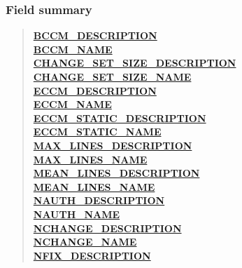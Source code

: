 {{\subsubsection{Field summary}{
\begin{verse}
\hyperlink{it.unisa.sesa.repominer.db.entities.Metric.BCCM_DESCRIPTION}{{\bf BCCM\_DESCRIPTION}} \\
\hyperlink{it.unisa.sesa.repominer.db.entities.Metric.BCCM_NAME}{{\bf BCCM\_NAME}} \\
\hyperlink{it.unisa.sesa.repominer.db.entities.Metric.CHANGE_SET_SIZE_DESCRIPTION}{{\bf CHANGE\_SET\_SIZE\_DESCRIPTION}} \\
\hyperlink{it.unisa.sesa.repominer.db.entities.Metric.CHANGE_SET_SIZE_NAME}{{\bf CHANGE\_SET\_SIZE\_NAME}} \\
\hyperlink{it.unisa.sesa.repominer.db.entities.Metric.ECCM_DESCRIPTION}{{\bf ECCM\_DESCRIPTION}} \\
\hyperlink{it.unisa.sesa.repominer.db.entities.Metric.ECCM_NAME}{{\bf ECCM\_NAME}} \\
\hyperlink{it.unisa.sesa.repominer.db.entities.Metric.ECCM_STATIC_DESCRIPTION}{{\bf ECCM\_STATIC\_DESCRIPTION}} \\
\hyperlink{it.unisa.sesa.repominer.db.entities.Metric.ECCM_STATIC_NAME}{{\bf ECCM\_STATIC\_NAME}} \\
\hyperlink{it.unisa.sesa.repominer.db.entities.Metric.MAX_LINES_DESCRIPTION}{{\bf MAX\_LINES\_DESCRIPTION}} \\
\hyperlink{it.unisa.sesa.repominer.db.entities.Metric.MAX_LINES_NAME}{{\bf MAX\_LINES\_NAME}} \\
\hyperlink{it.unisa.sesa.repominer.db.entities.Metric.MEAN_LINES_DESCRIPTION}{{\bf MEAN\_LINES\_DESCRIPTION}} \\
\hyperlink{it.unisa.sesa.repominer.db.entities.Metric.MEAN_LINES_NAME}{{\bf MEAN\_LINES\_NAME}} \\
\hyperlink{it.unisa.sesa.repominer.db.entities.Metric.NAUTH_DESCRIPTION}{{\bf NAUTH\_DESCRIPTION}} \\
\hyperlink{it.unisa.sesa.repominer.db.entities.Metric.NAUTH_NAME}{{\bf NAUTH\_NAME}} \\
\hyperlink{it.unisa.sesa.repominer.db.entities.Metric.NCHANGE_DESCRIPTION}{{\bf NCHANGE\_DESCRIPTION}} \\
\hyperlink{it.unisa.sesa.repominer.db.entities.Metric.NCHANGE_NAME}{{\bf NCHANGE\_NAME}} \\
\hyperlink{it.unisa.sesa.repominer.db.entities.Metric.NFIX_DESCRIPTION}{{\bf NFIX\_DESCRIPTION}} \\

\end{verse}}}}
